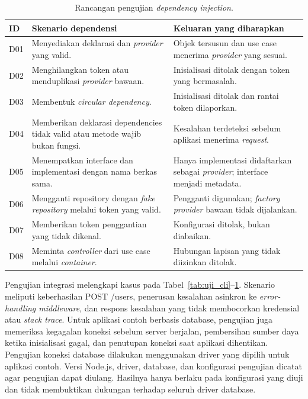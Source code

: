 \documentclass[12pt,a4paper,oneside]{report}
\begin{document}
\begin{table}[!htbp]
\centering\singlespacing\small
\begin{tabularx}{\textwidth}{@{}l >{\raggedright\arraybackslash}X >{\raggedright\arraybackslash}X@{}}
\toprule
\textbf{ID} & \textbf{Skenario dependensi} & \textbf{Keluaran yang diharapkan} \\
\midrule
D01 & Menyediakan deklarasi dan \textit{provider} yang valid. & Objek tersusun dan use case menerima \textit{provider} yang sesuai. \\
D02 & Menghilangkan token atau menduplikasi \textit{provider} bawaan. & Inisialisasi ditolak dengan token yang bermasalah. \\
D03 & Membentuk \textit{circular dependency}. & Inisialisasi ditolak dan rantai token dilaporkan. \\
D04 & Memberikan deklarasi dependencies tidak valid atau metode wajib bukan fungsi. & Kesalahan terdeteksi sebelum aplikasi menerima \textit{request}. \\
D05 & Menempatkan interface dan implementasi dengan nama berkas sama. & Hanya implementasi didaftarkan sebagai \textit{provider}; interface menjadi metadata. \\
D06 & Mengganti repository dengan \textit{fake repository} melalui token yang valid. & Pengganti digunakan; \textit{factory} \textit{provider} bawaan tidak dijalankan. \\
D07 & Memberikan token penggantian yang tidak dikenal. & Konfigurasi ditolak, bukan diabaikan. \\
D08 & Meminta \textit{controller} dari use case melalui \textit{container}. & Hubungan lapisan yang tidak diizinkan ditolak. \\
\bottomrule
\end{tabularx}
\caption{Rancangan pengujian \textit{dependency injection}.}
\label{tab:uji_dependensi}
\end{table}
\FloatBarrier

Pengujian integrasi melengkapi kasus pada Tabel~\ref{tab:uji_cli}--\ref{tab:uji_dependensi}. Skenario meliputi keberhasilan POST /users, penerusan kesalahan asinkron ke \textit{error-handling middleware}, dan respons kesalahan yang tidak membocorkan kredensial atau \textit{stack trace}. Untuk aplikasi contoh berbasis database, pengujian juga memeriksa kegagalan koneksi sebelum server berjalan, pembersihan sumber daya ketika inisialisasi gagal, dan penutupan koneksi saat aplikasi dihentikan. Pengujian koneksi database dilakukan menggunakan driver yang dipilih untuk aplikasi contoh. Versi Node.js, driver, database, dan konfigurasi pengujian dicatat agar pengujian dapat diulang. Hasilnya hanya berlaku pada konfigurasi yang diuji dan tidak membuktikan dukungan terhadap seluruh driver database.
\end{document}
